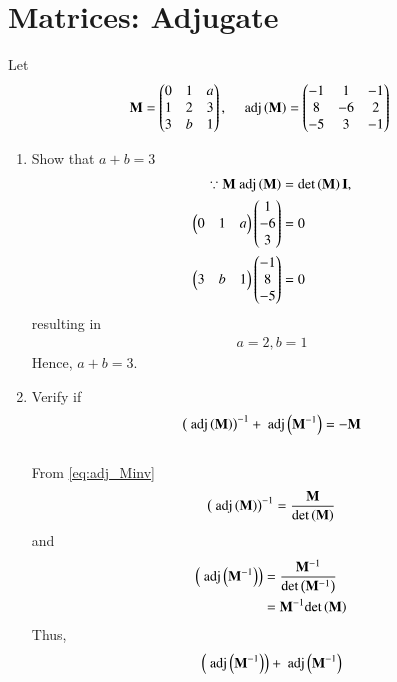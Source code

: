 \documentclass[journal,12pt,twocolumn]{IEEEtran}
\renewcommand\thesection{\arabic{section}}
\begin{document}
\section{Matrices: Adjugate}
Let 
\begin{align}
\mathbf{M} = \begin{pmatrix}0 & 1 & a \\ 1 & 2 & 3 \\ 3 & b & 1\end{pmatrix}, \quad 
\text{ adj}\left(\mathbf{M}\right) = \begin{pmatrix}-1 & 1 & -1 \\ 8 & -6 & 2 \\ -5 & 3 & -1\end{pmatrix}
\end{align}
\begin{enumerate}[label=\thesection.\arabic*
,ref=\thesection.\theenumi]
\item Show that $a+b = 3$
\\
\solution 
\begin{align}
\label{eq:adj_Minv}
\because \mathbf{M} \text{ adj}\left(\mathbf{M}\right) &= \det \left(\mathbf{M}\right)\mathbf{I},
\\
\begin{pmatrix}0 & 1 & a \end{pmatrix} 
 \begin{pmatrix}1 \\ -6 \\ 3\end{pmatrix} &= 0
\\
\begin{pmatrix}3 & b & 1 \end{pmatrix} 
 \begin{pmatrix}-1 \\ 8 \\ -5\end{pmatrix} &= 0
\end{align}
%
resulting in 
\begin{align}
a = 2, b = 1
\end{align}
Hence, $a+b = 3$.
\item Verify if 
\begin{align}
\left(\text{ adj}\left(\mathbf{M}\right)\right)^{-1} + \text{ adj}\left(\mathbf{M}^{-1}\right) = -\mathbf{M}
\end{align}
\\
\solution From \eqref{eq:adj_Minv}
\begin{align}
\left(\text{ adj}\left(\mathbf{M}\right)\right)^{-1} = \frac{\mathbf{M}}{\det\left(\mathbf{M}\right)}
\end{align}
%
and 
\begin{align}
\left(\text{ adj}\left(\mathbf{M}^{-1}\right)\right) &= \frac{\mathbf{M}^{-1}}{\det\left(\mathbf{M}^{-1}\right)}
\\
&= {\mathbf{M}^{-1}}{\det\left(\mathbf{M}\right)}
\end{align}
%
Thus, 
\begin{multline}
\brak{\text{ adj}\brak{\vec{M}^{-1}}} + \text{ adj}\brak{\vec{M}^{-1}}

\end{multline}
\end{enumerate}
\end{document}
